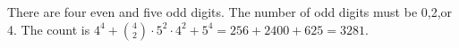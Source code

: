 There are four even and five odd digits. The number of odd digits must be 0,2,or 4. The count is $4^4+\binom42\cdot5^2\cdot4^2+5^4=256+2400+625=\boxed{3281}$.
